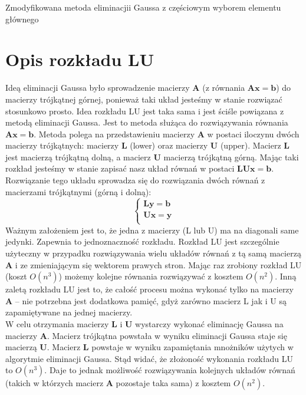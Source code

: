 \documentclass[]{article}
\newcommand{\mA}{\bm{A}}
\newcommand{\mL}{\bm{L}}
\newcommand{\mU}{\bm{U}}
\newcommand{\vb}{\bm{b}}
\newcommand{\vx}{\bm{x}}
\begin{document}
\begin{algorithm}[h]
{			\KwRet \X\;
		}
		\caption{Zmodyfikowana metoda eliminacjii Gaussa z częściowym wyborem elementu głównego}
	\end{algorithm} 
	
	
	\clearpage
	\section*{Opis rozkładu LU}
	
	Ideą eliminacji Gaussa było sprowadzenie macierzy $\mA$ (z równania $\mA\vx=\vb$) do macierzy trójkątnej górnej, ponieważ taki układ jesteśmy w stanie rozwiązać stosunkowo prosto. Idea rozkładu LU jest taka sama i jest ściśle powiązana z metodą eliminacji Gaussa. Jest to metoda służąca do rozwiązywania równania $\mA\vx=\vb$. Metoda polega na przedstawieniu macierzy $\mA$ w postaci iloczynu dwóch macierzy trójkątnych: macierzy $\mL$ (lower) oraz macierzy $\mU$ (upper). Macierz $\mL$ jest macierzą trójkątną dolną, a macierz $\mU$ macierzą trójkątną górną. Mając taki rozkład jesteśmy w stanie zapisać nasz układ równań w postaci $\mL\mU\vx=\vb$. Rozwiązanie tego układu sprowadza się do rozwiązania dwóch równań z macierzami trójkątnymi (górną i dolną):
	$$\left\{
	\begin{array}{ll}
		\mL \bm{y}= \vb\\
		\mU \vx= \bm{y} \\
	\end{array}
	\right.$$
	Ważnym założeniem jest to, że jedna z macierzy (L lub U) ma na diagonali same jedynki. Zapewnia to jednoznaczność rozkładu. Rozkład LU jest szczególnie użyteczny w przypadku rozwiązywania wielu układów równań z tą samą macierzą $\mA$ i ze zmieniającym się wektorem prawych stron. Mając raz zrobiony rozkład LU (koszt $O(n^3)$) możemy kolejne równania rozwiązywać z kosztem $O(n^2)$.
	Inną zaletą rozkładu LU jest to, że całość procesu można wykonać tylko na macierzy $\mA$ -- nie potrzebna jest dodatkowa pamięć, gdyż zarówno macierz L jak i U są zapamiętywane na jednej macierzy.\\
	W celu otrzymania macierzy  $\mL$ i $\mU$ wystarczy wykonać eliminację Gaussa na macierzy $\mA$. Macierz trójkątna powstała w wyniku eliminacji Gaussa staje się macierzą $\mU$. Macierz  $\mL$ powstaje w wyniku zapamiętania mnożników użytych w algorytmie eliminacji Gaussa. Stąd widać, że złożoność wykonania rozkładu LU to $O(n^3)$. Daje to jednak możliwość rozwiązywania kolejnych układów równań (takich w którzych macierz $\mA$ pozostaje taka sama) z kosztem $O(n^2)$.
	
\end{document}
